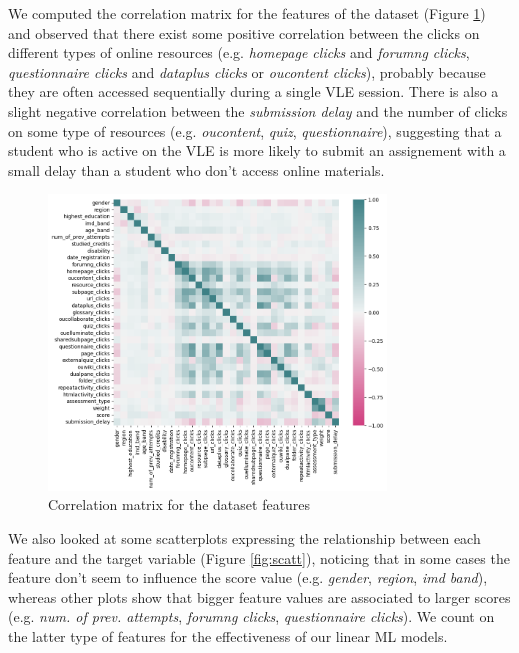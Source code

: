 \documentclass{article}
\begin{document}
We computed the correlation matrix for the features of the dataset (Figure \ref{fig:corrmatr}) and observed that there exist some positive correlation between the clicks on different types of online resources (e.g. \textit{homepage clicks} and \textit{forumng clicks}, \textit{questionnaire clicks} and \textit{dataplus clicks} or \textit{oucontent clicks}), probably because they are often accessed sequentially during a single VLE session. There is also a slight negative correlation between the \textit{submission delay} and the number of clicks on some type of resources (e.g. \textit{oucontent}, \textit{quiz}, \textit{questionnaire}), suggesting that a student who is active on the VLE is more likely to submit an assignement with a small delay than a student who don't access online materials.\\

\begin{figure}[h!]
\centering
\includegraphics[width=0.8\textwidth]{correlationmatrix.png}
\caption{\label{fig:corrmatr}Correlation matrix for the dataset features}
\end{figure}

We also looked at some scatterplots expressing the relationship between each feature and the target variable (Figure \ref{fig:scatt}), noticing that in some cases the feature don't seem to influence the score value (e.g. \textit{gender}, \textit{region}, \textit{imd band}), whereas other plots show that bigger feature values are associated to larger scores (e.g. \textit{num. of prev. attempts}, \textit{forumng clicks}, \textit{questionnaire clicks}). We count on the latter type of features for the effectiveness of our linear ML models.\\
\newpage
\end{document}
